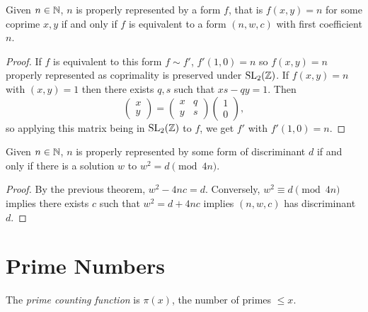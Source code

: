 \documentclass[a4paper, 10pt]{amsart}
\begin{document}

\begin{theorem}
    Given $n \in \mathbb{N}$, $n$ is properly represented by a form $f$, that is $f(x,y) = n$ for some coprime $x, y$
if and only if $f$ is equivalent to a form $(n, w, c)$ with first coefficient $n$.
    \end{theorem} 
\begin{proof}
    If $f$ is equivalent to this form $f \sim f'$, $f'(1, 0) = n$ so $f(x, y) = n$ properly represented as coprimality is preserved under $\operatorname{SL}_2(\mathbb{Z})$. 
    If $f(x, y) = n$ with $(x, y) = 1$ then there exists $q, s$ such that $xs - qy = 1$. Then
    $$
    \begin{pmatrix}
        x \\ y
    \end{pmatrix} = \begin{pmatrix}
        x & q \\ y & s
    \end{pmatrix} \begin{pmatrix}
        1 \\ 0
    \end{pmatrix},
    $$ 
    so applying this matrix being in $\operatorname{SL}_2(\mathbb{Z})$ to $f$, we get $f'$ with $f'(1, 0) = n$.
\end{proof}

\begin{theorem}
    Given $n \in \mathbb{N}$, $n$ is properly represented by some form of discriminant $d$ if and only if there is a solution $w$ to $w^2 = d\pmod{4n}$. 
\end{theorem}
\begin{proof}
    By the previous theorem, $w^2 - 4nc = d$. Conversely, $w^2 \equiv d\pmod{4n}$ implies there exists $c$ such that $w^2 = d + 4nc$ implies $(n, w, c)$ has discriminant $d$.
\end{proof}


\section{Prime Numbers}

\begin{definition}
The \emph{prime counting function} is $\pi(x)$, the number of primes $\leq x$.
\end{definition}
\end{document}
